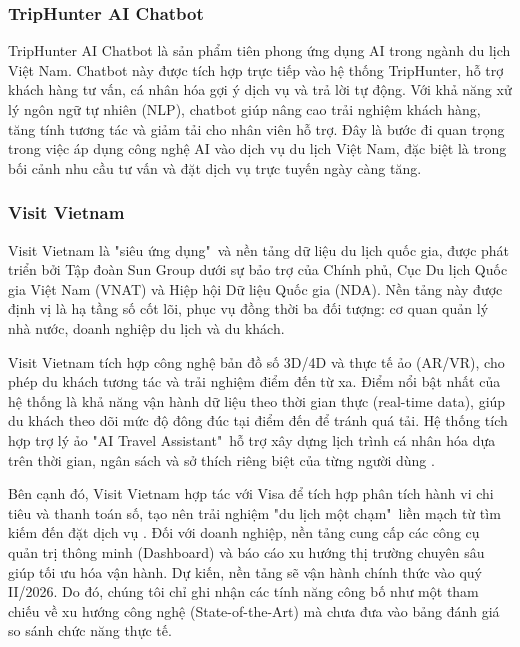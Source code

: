 \subsubsection{TripHunter AI Chatbot}
TripHunter AI Chatbot là sản phẩm tiên phong ứng dụng AI trong ngành du lịch Việt Nam. Chatbot này được tích hợp trực tiếp vào hệ thống TripHunter, hỗ trợ khách hàng tư vấn, cá nhân hóa gợi ý dịch vụ và trả lời tự động. Với khả năng xử lý ngôn ngữ tự nhiên (NLP), chatbot giúp nâng cao trải nghiệm khách hàng, tăng tính tương tác và giảm tải cho nhân viên hỗ trợ. Đây là bước đi quan trọng trong việc áp dụng công nghệ AI vào dịch vụ du lịch Việt Nam, đặc biệt là trong bối cảnh nhu cầu tư vấn và đặt dịch vụ trực tuyến ngày càng tăng.

\subsubsection{Visit Vietnam}
Visit Vietnam là "siêu ứng dụng"\ và nền tảng dữ liệu du lịch quốc gia, được phát triển bởi Tập đoàn Sun Group dưới sự bảo trợ của Chính phủ, Cục Du lịch Quốc gia Việt Nam (VNAT) và Hiệp hội Dữ liệu Quốc gia (NDA). Nền tảng này được định vị là hạ tầng số cốt lõi, phục vụ đồng thời ba đối tượng: cơ quan quản lý nhà nước, doanh nghiệp du lịch và du khách.

Visit Vietnam tích hợp công nghệ bản đồ số 3D/4D và thực tế ảo (AR/VR), cho phép du khách tương tác và trải nghiệm điểm đến từ xa. Điểm nổi bật nhất của hệ thống là khả năng vận hành dữ liệu theo thời gian thực (real-time data), giúp du khách theo dõi mức độ đông đúc tại điểm đến để tránh quá tải. Hệ thống tích hợp trợ lý ảo "AI Travel Assistant"\ hỗ trợ xây dựng lịch trình cá nhân hóa dựa trên thời gian, ngân sách và sở thích riêng biệt của từng người dùng \cite{vnexpress2025_dulich}. 

Bên cạnh đó, Visit Vietnam hợp tác với Visa để tích hợp phân tích hành vi chi tiêu và thanh toán số, tạo nên trải nghiệm "du lịch một chạm"\ liền mạch từ tìm kiếm đến đặt dịch vụ \cite{cafef2025}. Đối với doanh nghiệp, nền tảng cung cấp các công cụ quản trị thông minh (Dashboard) và báo cáo xu hướng thị trường chuyên sâu giúp tối ưu hóa vận hành. Dự kiến, nền tảng sẽ vận hành chính thức vào quý II/2026. Do đó, chúng tôi chỉ ghi nhận các tính năng công bố như một tham chiếu về xu hướng công nghệ (State-of-the-Art) mà chưa đưa vào bảng đánh giá so sánh chức năng thực tế.


